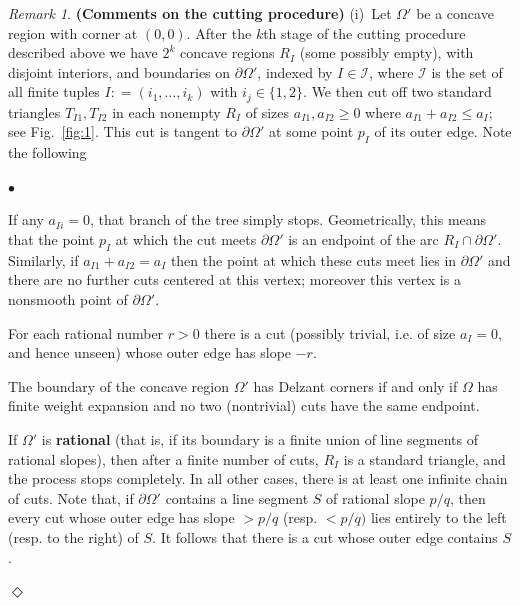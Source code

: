 \documentclass[11pt, reqno]{amsart}
\theoremstyle{remark}
\numberwithin{equation}{subsection}
\numberwithin{figure}{section}
\theoremstyle{customremark}
\newtheorem{rmk_no_diamond}[thm]{Remark}
\newenvironment{rmk}{\begin{rmk_no_diamond} } {\hfill$\er$ \end{rmk_no_diamond}}
\newcommand{\Ii}{\mathcal{I}}
\newenvironment{itemlist}
   { \begin{list} {$\bullet$}
         { \setlength{\topsep}{.5ex}  \setlength{\itemsep}{.5ex} \setlength{\leftmargin}{2.5ex} } }
   { \end{list} }
\newcommand{\Om}{{\Omega}}
\newcommand{\p}{{\partial}}
\newcommand{\MS}{{\medskip}}
\newcommand{\er}{{\Diamond}}
\begin{document}
\begin{rmk}\label{rmk:cut}\rm {\bf (Comments on the cutting procedure)} 
(i)\ Let $\Om'$ be a concave region with corner at $(0,0)$.
After the $k$th stage of the cutting procedure described above
we have $2^{k}$ concave regions  $R_I$ (some possibly empty), with disjoint interiors, and boundaries on $\p \Om'$,
indexed by $I\in \Ii$, where $\Ii$ is the set of all finite tuples  $I: =  (i_1,\dots, i_{k})$ with $i_j\in \{1,2\}$.
We then cut off  two standard triangles $T_{I1}, T_{I2}$ in each nonempty $R_I$ of sizes $a_{I1}, a_{I2}\ge 0$ where $a_{I1}+ a_{I2}\le a_I$; see Fig.~\ref{fig:1}.  This cut is tangent to $\p \Om'$ at some point $p_I$ of its outer edge.  Note the following
\begin{itemlist}


 \item[{\rm (a)}]
  If any $a_{Ii}=0$, that branch of the tree simply stops.  Geometrically, this means that the 
  point $p_I$ at which the cut meets  $\p \Om'$ is an endpoint of the arc $R_I\cap \p\Om'$.
  Similarly, if $a_{I1} + a_{I2} = a_I$ then the point at which these cuts meet lies in $\p\Om'$ and there are no further cuts centered at this vertex; moreover this vertex is a nonsmooth point of $\p\Om'$.

 
 \item[{\rm (b)}]  For each rational number $ r> 0$  there is a cut (possibly trivial, i.e. of size $a_I=0$, and hence unseen) whose outer edge has slope $-r$.

 \item[{\rm (c)}]  The boundary of the concave region $\Om'$ has Delzant corners if and only if $\Om$ has finite weight expansion and no two (nontrivial) cuts have the same endpoint.

 \item[{\rm (d)}] If $\Om'$ is {\bf rational} (that is, if its boundary is a finite union of line segments of rational slopes),
 then after a finite number of cuts, $R_I$ is a standard triangle, and the process stops completely. In all other cases, there is at least one infinite chain of cuts.  Note that, if $\p \Om'$ contains a line segment $S$ of rational slope $p/q$, then every cut whose outer edge  has slope $> p/q$ (resp. $< p/q)$ lies entirely to the left (resp. to the right) of $S$. It follows that there is a cut  whose outer edge  contains $S$.
   \end{itemlist}
   \MS
   

\end{rmk}
\end{document}
